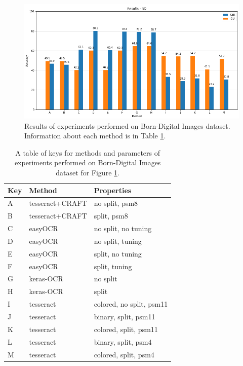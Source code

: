 {
\begin{figure}[hbtp!]
    \centering
    \includegraphics[width=\textwidth]{obrazky/grafy/resBD.png}
    \caption{Results of experiments performed on Born-Digital Images dataset. Information about each method is in Table \ref*{Tab:resBD}.}
    \label{Im:resBD}
\end{figure}
\begin{table}[!hbt]
    \centering
    \begin{tabular}{|l|l|l|}
    \hline
        Key & Method & Properties \\ \hline
        A & tesseract+CRAFT &  no split, psm8\\ 
        B & tesseract+CRAFT &  split, psm8\\ \hline
        C & easyOCR &  no split, no tuning\\ 
        D & easyOCR &  no split, tuning\\ 
        E & easyOCR &  split, no tuning\\ 
        F & easyOCR &  split, tuning\\ \hline
        G & keras-OCR &  no split\\ 
        H & keras-OCR &  split\\ \hline
        I & tesseract & colored, no split, psm11\\ 
        J & tesseract & binary, split, psm11\\ 
        K & tesseract & colored, split, psm11\\ 
        L & tesseract & binary, split, psm4\\ 
        M & tesseract & colored, split, psm4\\ \hline
    \end{tabular}
    \caption{A table of keys for methods and parameters of experiments performed on Born-Digital Images dataset for Figure \ref*{Im:resBD}.}
    \label{Tab:resBD}
\end{table}
}


